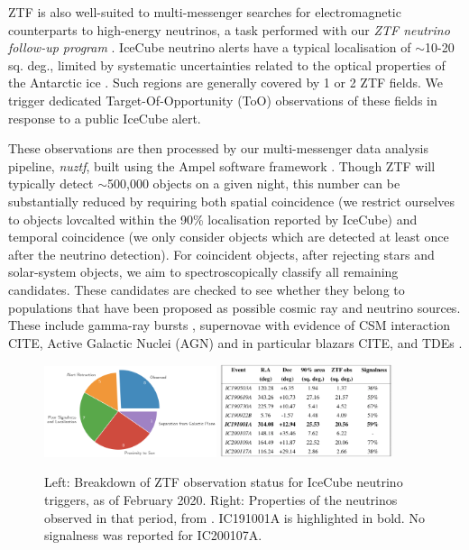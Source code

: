 \documentclass[a4paper,11pt]{article}
\begin{document}
ZTF is also well-suited to multi-messenger searches for electromagnetic counterparts to high-energy neutrinos, a task performed with our \emph{ZTF neutrino follow-up program} \cite{bran}. IceCube neutrino alerts have a typical localisation of $\sim$10-20 sq. deg., limited by systematic uncertainties related to the optical properties of the Antarctic ice \cite{ic_resimulations_21}. Such regions are generally covered by 1 or 2 ZTF fields. We trigger dedicated Target-Of-Opportunity (ToO) observations of these fields in response to a public IceCube alert. 

These observations are then processed by our multi-messenger data analysis pipeline, \emph{nuztf}, built using the Ampel software framework \cite{ampel, nuztf}. Though ZTF will typically detect $\sim$500,000 objects on a given night, this number can be substantially reduced by requiring both spatial coincidence (we restrict ourselves to objects lovcalted within the 90\% localisation reported by IceCube) and temporal coincidence (we only consider objects which are detected at least once after the neutrino detection). For coincident objects, after rejecting stars and solar-system objects, we aim to spectroscopically classify all remaining candidates. These candidates are checked to see whether they belong to populations that have been proposed as possible cosmic ray and neutrino sources. These include gamma-ray bursts \cite{waxman_bahcall_97_grb}, supernovae with evidence of CSM interaction CITE, Active Galactic Nuclei (AGN) \cite{stecker_91} and in particular blazars CITE, and TDEs \cite{winter_bran_21, winter_icrc_21, murase_tde_20, hayasaki_19, liu21_bran}.

\begin{figure}[!ht]
	\centering 
	\includegraphics[width=0.45\textwidth]{figures/ztf_pie}
	\includegraphics[width=0.45\textwidth]{figures/ztf_nu_table}
	\caption{Left: Breakdown of ZTF observation status for IceCube neutrino triggers, as of February 2020. Right: Properties of the neutrinos observed in that period, from \cite{bran}. IC191001A is highlighted in bold. No signalness was reported for IC200107A. }
	\label{fig:ztf_stats_bran}
\end{figure}
\end{document}

